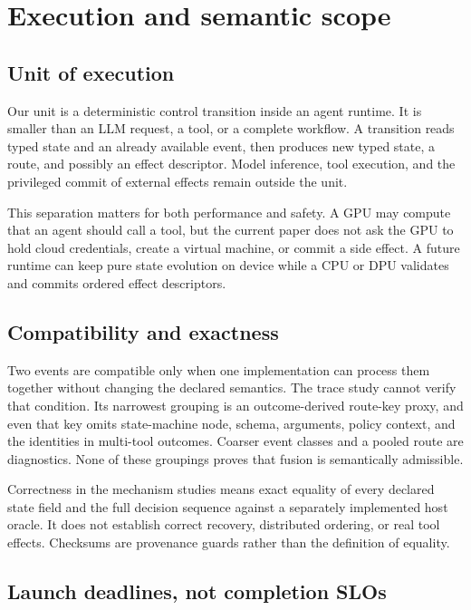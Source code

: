 \section{Execution and semantic scope}
\label{sec:scope}

\subsection{Unit of execution}

Our unit is a deterministic control transition inside an agent runtime. It is
smaller than an LLM request, a tool, or a complete workflow. A transition reads
typed state and an already available event, then produces new typed state, a
route, and possibly an effect descriptor. Model inference, tool execution, and
the privileged commit of external effects remain outside the unit.

This separation matters for both performance and safety. A GPU may compute
that an agent should call a tool, but the current paper does not ask the GPU to
hold cloud credentials, create a virtual machine, or commit a side effect. A
future runtime can keep pure state evolution on device while a CPU or DPU
validates and commits ordered effect descriptors.

\subsection{Compatibility and exactness}

Two events are compatible only when one implementation can process them
together without changing the declared semantics. The trace study cannot
verify that condition. Its narrowest grouping is an outcome-derived route-key
proxy, and even that key omits state-machine node, schema, arguments, policy
context, and the identities in multi-tool outcomes. Coarser event classes and a
pooled route are diagnostics. None of these groupings proves that fusion is
semantically admissible.

Correctness in the mechanism studies means exact equality of every declared
state field and the full decision sequence against a separately implemented
host oracle. It does not establish correct recovery, distributed ordering, or
real tool effects. Checksums are provenance guards rather than the definition
of equality.

\subsection{Launch deadlines, not completion SLOs}

